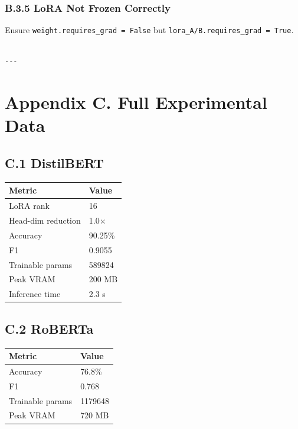 \subsubsection{B.3.5 LoRA Not Frozen Correctly}

Ensure \texttt{weight.requires\_grad = False} but \texttt{lora\_A/B.requires\_grad = True}.
\begin{lstlisting}

---
\end{lstlisting}


\section{Appendix C. Full Experimental Data}

\subsection{C.1 DistilBERT}

\begin{table}[H]
\centering
\small
\begin{tabular}{ll}
\toprule
\textbf{Metric} & \textbf{Value} \\
\midrule
LoRA rank & 16 \\
Head-dim reduction & 1.0$\times$ \\
Accuracy & 90.25\% \\
F1 & 0.9055 \\
Trainable params & 589824 \\
Peak VRAM & 200 MB \\
Inference time & 2.3 s \\
\bottomrule
\end{tabular}
\end{table}

\subsection{C.2 RoBERTa}

\begin{table}[H]
\centering
\small
\begin{tabular}{ll}
\toprule
\textbf{Metric} & \textbf{Value} \\
\midrule
Accuracy & 76.8\% \\
F1 & 0.768 \\
Trainable params & 1179648 \\
Peak VRAM & 720 MB \\
\bottomrule
\end{tabular}
\end{table}

